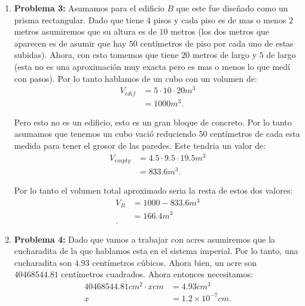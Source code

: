 \documentclass[12pt]{exam}
\begin{document}
\begin{enumerate}
  \item \textbf{Problema 3:} Asumamos para el edificio $B$ que este fue diseñado como un prisma rectangular. Dado que tiene 4 pisos y cada piso es de mas o menos $2$ metros asumiremos que su altura es de $10$ metros (los dos metros que aparecen es de asumir que hay $50$ centímetros de piso por cada uno de estas subidas). Ahora, con esto tomemos que tiene $20$ metros de largo y $5$ de largo (esta no es una aproximación muy exacta pero es mas o menos lo que medí con pasos). Por lo tanto hablamos de un cubo con un volumen de:
    \begin{align*}
      V_{edif} &= 5 \cdot 10 \cdot 20 m^{3} \\
      &= 1000 m^{3}
    .\end{align*}

    Pero esto no es un edificio, esto es un gran bloque de concreto. Por lo tanto asumamos que tenemos un cubo vació reduciendo $50$ centímetros de cada esta medida para tener el grosor de las paredes. Este tendria un valor de:
    \begin{align*}
      V_{empty} &= 4.5 \cdot 9.5 \cdot 19.5 m^{3}\\
      &= 833.6 m^{3}
    .\end{align*}

    Por lo tanto el volumen total aproximado seria la resta de estos dos valores:
    \begin{align*}
      V_{B} &= 1000 - 833.6 m^{3} \\
      &= 166.4 m^{3}\\
    .\end{align*}

  \item \textbf{Problema 4:} Dado que vamos a trabajar con acres asumiremos que la cucharadita de la que hablamos esta en el sistema imperial. Por lo tanto, una cucharadita son $4.93$ centímetros cúbicos. Ahora bien, un acre son $40468544.81$ centímetros cuadrados. Ahora entonces necesitamos:
    \begin{align*}
      40468544.81 cm^{2}\cdot x cm &= 4.93 cm^{3}\\
      x &= 1.2 \times 10^{-7} cm
    .\end{align*}


\end{enumerate}
\end{document}
